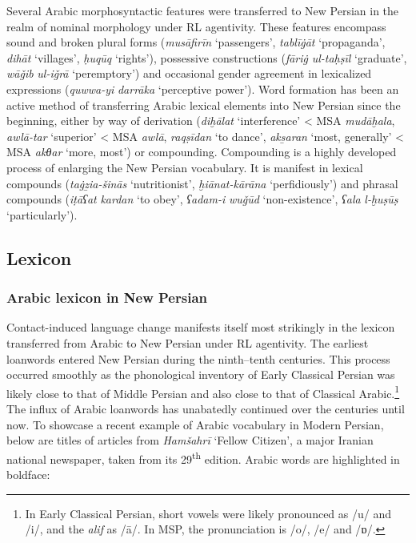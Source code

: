 \documentclass[output=paper]{langsci/langscibook}
\begin{document}
Several Arabic morphosyntactic features were transferred to New Persian in the realm of nominal morphology under RL agentivity. These features encompass sound and broken plural forms (\textit{musāfirīn} ‘passengers’, \textit{tablī\.gāt} ‘propaganda’, \textit{dihāt} ‘villages’, \textit{ḥuqūq} ‘rights’), possessive constructions (\textit{fāri\.g} \textit{ul-taḥṣīl} ‘graduate’, \textit{wāǧib} \textit{ul-iǧrā} ‘peremptory’) and occasional gender agreement in lexicalized expressions (\textit{quwwa-yi} \textit{darrāka} ‘perceptive power’). Word formation has been an active method of transferring Arabic lexical elements into New Persian since the beginning, either by way of derivation (\textit{diḫālat} ‘interference’ < MSA \textit{mudāḫala}, \textit{awlā-tar} ‘superior’ < MSA \textit{awlā}, \textit{raqṣīdan} ‘to dance’, \textit{aks̱aran} ‘most, generally’ < MSA \textit{akθar} ‘more, most’) or compounding. Compounding is a highly developed process of enlarging the New Persian vocabulary. It is manifest in lexical compounds (\textit{ta\.gẕia-šinās} ‘nutritionist’, \textit{ḫiānat-kārāna} ‘perfidiously’) and phrasal compounds (\textit{iṭāʕat} \textit{kardan} ‘to obey’, \textit{ʕadam-i} \textit{wuǧūd} ‘non-existence’, \textit{ʕala} \textit{l-ḫuṣūṣ} ‘particularly’).

\subsection{Lexicon}

\subsubsection{Arabic lexicon in New Persian}

Contact-induced language change manifests itself most strikingly in the lexicon transferred from Arabic to New Persian under RL agentivity. The earliest loanwords entered New Persian during the ninth–tenth centuries. This process occurred smoothly as the phonological inventory of Early Classical Persian was likely close to that of Middle Persian and also close to that of Classical Arabic.\footnote{In Early Classical Persian, short vowels were likely pronounced as /u/ and /i/, and the \textit{alif} as /ā/. In MSP, the pronunciation is /o/, /e/ and /ɒ/.} The influx of Arabic loanwords has unabatedly continued over the centuries until now. To showcase a recent example of Arabic vocabulary in Modern Persian, below are titles of articles from \textit{Hamšahrī} ‘Fellow Citizen’, a major Iranian national newspaper, taken from its 29\textsuperscript{th} \citealt{January2018} edition. Arabic words are highlighted in boldface:
\end{document}
